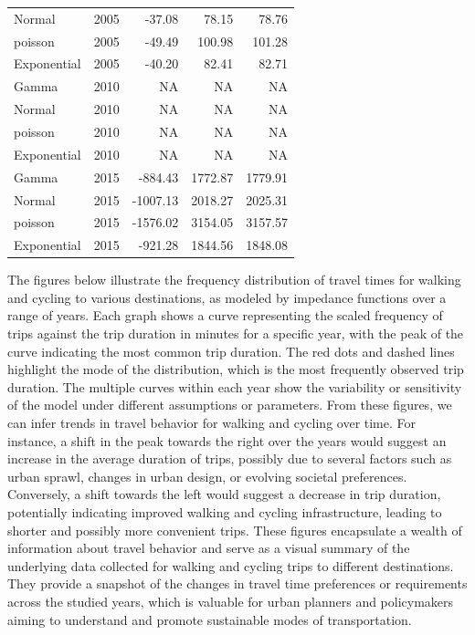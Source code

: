 \documentclass[
11pt, %
oneside, %
english, %
singlespacing, %
]{macthesis} %
\begin{document}
\begin{table}
\begin{tabular}{llrrr}
\hspace{1em}Normal & 2005 & -37.08 & 78.15 & 78.76\\
\hspace{1em}poisson & 2005 & -49.49 & 100.98 & 101.28\\
\hspace{1em}Exponential & 2005 & -40.20 & 82.41 & 82.71\\
\hspace{1em}Gamma & 2010 & NA & NA & NA\\
\hspace{1em}Normal & 2010 & NA & NA & NA\\
\hspace{1em}poisson & 2010 & NA & NA & NA\\
\hspace{1em}Exponential & 2010 & NA & NA & NA\\
\hspace{1em}Gamma & 2015 & -884.43 & 1772.87 & 1779.91\\
\hspace{1em}Normal & 2015 & -1007.13 & 2018.27 & 2025.31\\
\hspace{1em}poisson & 2015 & -1576.02 & 3154.05 & 3157.57\\
\hspace{1em}Exponential & 2015 & -921.28 & 1844.56 & 1848.08\\
\bottomrule
\end{tabular}
\endgroup{}
\end{table}

\newpage

The figures below illustrate the frequency distribution of travel times for walking and cycling to various destinations, as modeled by impedance functions over a range of years. Each graph shows a curve representing the scaled frequency of trips against the trip duration in minutes for a specific year, with the peak of the curve indicating the most common trip duration. The red dots and dashed lines highlight the mode of the distribution, which is the most frequently observed trip duration. The multiple curves within each year show the variability or sensitivity of the model under different assumptions or parameters.
From these figures, we can infer trends in travel behavior for walking and cycling over time. For instance, a shift in the peak towards the right over the years would suggest an increase in the average duration of trips, possibly due to several factors such as urban sprawl, changes in urban design, or evolving societal preferences. Conversely, a shift towards the left would suggest a decrease in trip duration, potentially indicating improved walking and cycling infrastructure, leading to shorter and possibly more convenient trips.
These figures encapsulate a wealth of information about travel behavior and serve as a visual summary of the underlying data collected for walking and cycling trips to different destinations. They provide a snapshot of the changes in travel time preferences or requirements across the studied years, which is valuable for urban planners and policymakers aiming to understand and promote sustainable modes of transportation.
\end{document}
